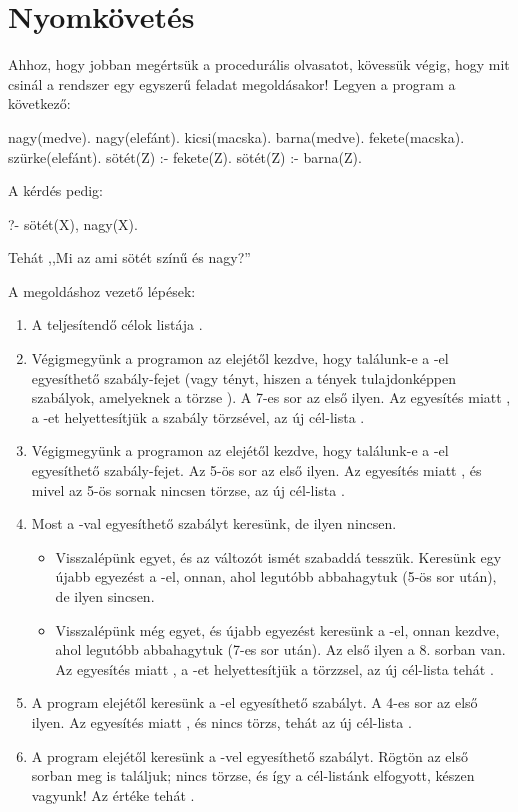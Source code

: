 \section{Nyomkövetés}
Ahhoz, hogy jobban megértsük a procedurális
olvasatot, kövessük végig, hogy mit csinál a
rendszer egy egyszerű feladat megoldásakor! Legyen a
program a következő:
\begin{program}
nagy(medve).
nagy(elefánt).
kicsi(macska).
barna(medve).
fekete(macska).
szürke(elefánt).
sötét(Z) :- fekete(Z).
sötét(Z) :- barna(Z).
\end{program}

A kérdés pedig:
\begin{query}
?- sötét(X), nagy(X).
\end{query}
Tehát ,,Mi az ami sötét színű és nagy?''

A megoldáshoz vezető lépések:
\begin{enumerate}
\item A teljesítendő célok listája .
\item Végigmegyünk a programon az elejétől kezdve,
  hogy találunk-e a -el egyesíthető
  szabály-fejet (vagy tényt, hiszen a tények
  tulajdonképpen szabályok, amelyeknek a törzse
  ). A 7-es sor az első ilyen. Az egyesítés
  miatt , a -et
  helyettesítjük a szabály törzsével, az új
  cél-lista .
\item Végigmegyünk a programon az elejétől kezdve,
  hogy találunk-e a -el egyesíthető
  szabály-fejet. Az 5-ös sor az első ilyen. Az
  egyesítés miatt , és mivel az 5-ös
  sornak nincsen törzse, az új cél-lista
  .
\item Most a -val egyesíthető szabályt keresünk, de ilyen nincsen.
  \begin{itemize}
    \item Visszalépünk egyet, és az  változót
      ismét szabaddá tesszük. Keresünk egy újabb
      egyezést a -el, onnan, ahol
      legutóbb abbahagytuk (5-ös sor után), de ilyen
      sincsen.
    \item Visszalépünk még egyet, és újabb egyezést
      keresünk a -el, onnan kezdve,
      ahol legutóbb abbahagytuk (7-es sor után). Az
      első ilyen a 8. sorban van. Az egyesítés miatt
      , a -et helyettesítjük
      a törzzsel, az új cél-lista tehát
      .
  \end{itemize}
\item A program elejétől keresünk a -el
  egyesíthető szabályt. A 4-es sor az első ilyen. Az
  egyesítés miatt , és nincs törzs,
  tehát az új cél-lista .
\item A program elejétől keresünk a
  -vel egyesíthető szabályt. Rögtön
  az első sorban meg is találjuk; nincs törzse, és
  így a cél-listánk elfogyott, készen vagyunk! Az
   értéke tehát .
\end{enumerate}

